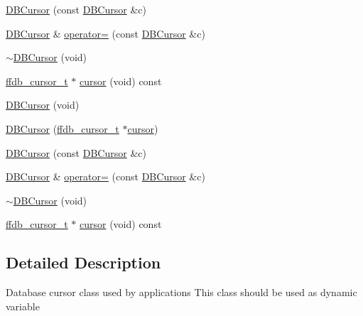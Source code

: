 \begin{DoxyCompactItemize}
\item 
\mbox{\hyperlink{classFILEDB_1_1DBCursor_ae65ab90dc14febbbfa277bfd0e1533db}{D\+B\+Cursor}} (const \mbox{\hyperlink{classFILEDB_1_1DBCursor}{D\+B\+Cursor}} \&c)
\item 
\mbox{\hyperlink{classFILEDB_1_1DBCursor}{D\+B\+Cursor}} \& \mbox{\hyperlink{classFILEDB_1_1DBCursor_a56fbc2127b869d0cfbac2de11f90efd8}{operator=}} (const \mbox{\hyperlink{classFILEDB_1_1DBCursor}{D\+B\+Cursor}} \&c)
\item 
\mbox{\hyperlink{classFILEDB_1_1DBCursor_a8c6c1bdf4c4279ab3e0d980e800c3542}{$\sim$\+D\+B\+Cursor}} (void)
\item 
\mbox{\hyperlink{adat-devel_2other__libs_2filedb_2filehash_2ffdb__db_8h_a1383f6fb3966b0ca74206ba93b687fd9}{ffdb\+\_\+cursor\+\_\+t}} $\ast$ \mbox{\hyperlink{classFILEDB_1_1DBCursor_a9e5b4a386c6f27bc1eb67714117e1e6d}{cursor}} (void) const
\item 
\mbox{\hyperlink{classFILEDB_1_1DBCursor_aba0d95e9eb892acd1722ca46e481459d}{D\+B\+Cursor}} (void)
\item 
\mbox{\hyperlink{classFILEDB_1_1DBCursor_aaa004d2a0c3ddb6b8df9f31600c29a3b}{D\+B\+Cursor}} (\mbox{\hyperlink{adat-devel_2other__libs_2filedb_2filehash_2ffdb__db_8h_a1383f6fb3966b0ca74206ba93b687fd9}{ffdb\+\_\+cursor\+\_\+t}} $\ast$\mbox{\hyperlink{classFILEDB_1_1DBCursor_a9e5b4a386c6f27bc1eb67714117e1e6d}{cursor}})
\item 
\mbox{\hyperlink{classFILEDB_1_1DBCursor_ae65ab90dc14febbbfa277bfd0e1533db}{D\+B\+Cursor}} (const \mbox{\hyperlink{classFILEDB_1_1DBCursor}{D\+B\+Cursor}} \&c)
\item 
\mbox{\hyperlink{classFILEDB_1_1DBCursor}{D\+B\+Cursor}} \& \mbox{\hyperlink{classFILEDB_1_1DBCursor_a56fbc2127b869d0cfbac2de11f90efd8}{operator=}} (const \mbox{\hyperlink{classFILEDB_1_1DBCursor}{D\+B\+Cursor}} \&c)
\item 
\mbox{\hyperlink{classFILEDB_1_1DBCursor_a8c6c1bdf4c4279ab3e0d980e800c3542}{$\sim$\+D\+B\+Cursor}} (void)
\item 
\mbox{\hyperlink{adat-devel_2other__libs_2filedb_2filehash_2ffdb__db_8h_a1383f6fb3966b0ca74206ba93b687fd9}{ffdb\+\_\+cursor\+\_\+t}} $\ast$ \mbox{\hyperlink{classFILEDB_1_1DBCursor_a9e5b4a386c6f27bc1eb67714117e1e6d}{cursor}} (void) const
\end{DoxyCompactItemize}


\subsection{Detailed Description}
Database cursor class used by applications This class should be used as dynamic variable 

